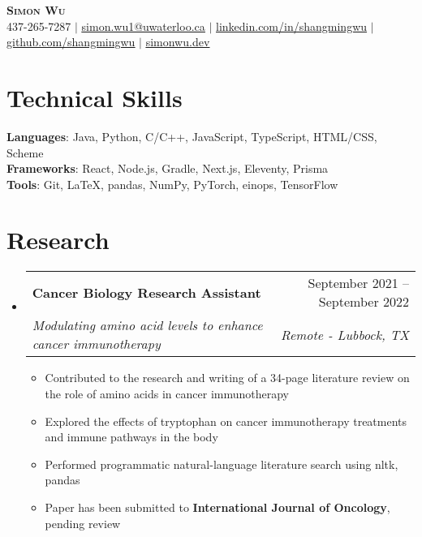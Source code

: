 \documentclass[letterpaper,11pt]{article}
\makeatletter
\newcommand{\resumeItem}[1]{
  \item\small{
    {#1 \vspace{-2pt}}
  }
}
\newcommand{\resumeSubheading}[4]{
  \vspace{-2pt}\item
    \begin{tabular*}{0.97\textwidth}[t]{l@{\extracolsep{\fill}}r}
      \textbf{#1} & #2 \\
      \textit{\small#3} & \textit{\small #4} \\
    \end{tabular*}\vspace{-7pt}
}
\newcommand{\resumeSubHeadingListStart}{\begin{itemize}[leftmargin=0.15in, label={}]}
\newcommand{\resumeSubHeadingListEnd}{\end{itemize}}
\newcommand{\resumeItemListStart}{\begin{itemize}}
\newcommand{\resumeItemListEnd}{\end{itemize}\vspace{-5pt}}
\makeatother
\begin{document}

\begin{center}
    \textbf{\Huge \scshape Simon Wu} \\ \vspace{1pt}
    \small 437-265-7287 $|$ \href{mailto:simon.wu1@uwaterloo.ca}{\underline{simon.wu1@uwaterloo.ca}} $|$ 
    \href{https://www.linkedin.com/in/simon-wu-53636a243}{\underline{linkedin.com/in/shangmingwu}} $|$
    \href{https://github.com/shangmingwu}{\underline{github.com/shangmingwu}} $|$
    \href{https://simonwu.dev}{\underline{simonwu.dev}}
\end{center}


\section{Technical Skills}
 \begin{itemize}[leftmargin=0.15in, label={}]
    \small{\item{
     \textbf{Languages}{: Java, Python, C/C++, JavaScript, TypeScript, HTML/CSS, Scheme } \\
     \textbf{Frameworks}{: React, Node.js, Gradle, Next.js, Eleventy, Prisma } \\
     \textbf{Tools}{: Git, \LaTeX, pandas, NumPy, PyTorch, einops, TensorFlow}
    }}
 \end{itemize}


\section{Research}
 \resumeSubHeadingListStart
  \resumeSubheading{Cancer Biology Research Assistant}{September 2021 -- September 2022}{Modulating amino acid levels to enhance cancer immunotherapy}{Remote - Lubbock, TX}
    \resumeItemListStart
        \resumeItem{Contributed to the research and writing of a 34-page literature review on the role of amino acids in cancer immunotherapy}
        \resumeItem{Explored the effects of tryptophan on cancer immunotherapy treatments and immune pathways in the body}
        \resumeItem{Performed programmatic natural-language literature search using nltk, pandas}
        \resumeItem{Paper has been submitted to \textbf{International Journal of Oncology}, pending review}
    \resumeItemListEnd
 \resumeSubHeadingListEnd
\end{document}

